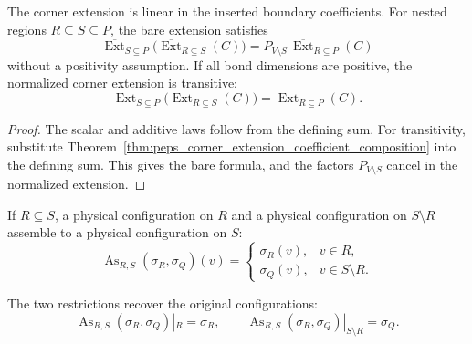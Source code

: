 \begin{theorem}
    \label{thm:peps_corner_extension_linear_transitive}
    \leanok
    The corner extension is linear in the inserted boundary coefficients.  For
    nested regions $R\subseteq S\subseteq P$, the bare extension satisfies
    \[
        \overline{\operatorname{Ext}}_{S\subseteq P}
        \bigl(\overline{\operatorname{Ext}}_{R\subseteq S}(C)\bigr)
        =
        P_{V\setminus S}\,
        \overline{\operatorname{Ext}}_{R\subseteq P}(C)
    \]
    without a positivity assumption.  If all bond dimensions are positive, the
    normalized corner extension is transitive:
    \[
        \operatorname{Ext}_{S\subseteq P}
        \bigl(\operatorname{Ext}_{R\subseteq S}(C)\bigr)
        =
        \operatorname{Ext}_{R\subseteq P}(C).
    \]
\end{theorem}
\begin{proof}
    \leanok
    The scalar and additive laws follow from the defining sum.  For
    transitivity, substitute
    Theorem~\ref{thm:peps_corner_extension_coefficient_composition} into the
    defining sum.  This gives the bare formula, and the factors
    $P_{V\setminus S}$ cancel in the normalized extension.
\end{proof}

\begin{definition}
    \label{def:peps_assemble_subregion_physical_config}
    \leanok
    If $R\subseteq S$, a physical configuration on $R$ and a physical
    configuration on $S\setminus R$ assemble to a physical configuration on
    $S$:
    \[
        \operatorname{As}_{R,S}(\sigma_R,\sigma_Q)(v)
        =
        \begin{cases}
        \sigma_R(v), & v\in R,\\
        \sigma_Q(v), & v\in S\setminus R.
        \end{cases}
    \]
\end{definition}

\begin{theorem}
    \label{thm:peps_assemble_subregion_physical_config_restricts}
    \leanok
    The two restrictions recover the original configurations:
    \[
        \operatorname{As}_{R,S}(\sigma_R,\sigma_Q)|_R=\sigma_R,
        \qquad
        \operatorname{As}_{R,S}(\sigma_R,\sigma_Q)|_{S\setminus R}=\sigma_Q.
    \]
\end{theorem}

